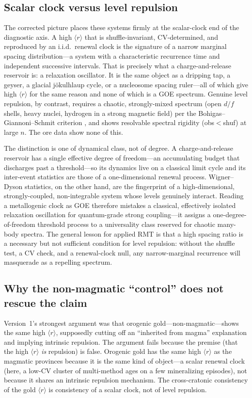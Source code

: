 \documentclass[12pt,a4paper]{article}
\newcommand{\rbar}{\langle r\rangle}
\begin{document}
\subsection{Scalar clock versus level repulsion}
The corrected picture places these systems firmly at the scalar-clock end of the
diagnostic axis. A high $\rbar$ that is shuffle-invariant, CV-determined, and
reproduced by an i.i.d.\ renewal clock is the signature of a narrow marginal
spacing distribution---a system with a characteristic recurrence time and
independent successive intervals. That is precisely what a charge-and-release
reservoir is: a relaxation oscillator. It is the same object as a dripping tap,
a geyser, a glacial j\"okulhlaup cycle, or a nucleosome spacing ruler---all of
which give high $\rbar$ for the same reason and none of which is a GOE spectrum.
Genuine level repulsion, by contrast, requires a chaotic, strongly-mixed spectrum
(open $d/f$ shells, heavy nuclei, hydrogen in a strong magnetic field) per the
Bohigas--Giannoni--Schmit criterion \citep{bgs1984}, and shows resolvable spectral
rigidity (obs$<$shuf) at large $n$. The ore data show none of this.

The distinction is one of dynamical class, not of degree. A charge-and-release
reservoir has a single effective degree of freedom---an accumulating budget that
discharges past a threshold---so its dynamics live on a classical limit cycle and
its inter-event statistics are those of a one-dimensional renewal process.
Wigner--Dyson statistics, on the other hand, are the fingerprint of a
high-dimensional, strongly-coupled, non-integrable system whose levels genuinely
interact. Reading a metallogenic clock as GOE therefore mistakes a classical,
effectively isolated relaxation oscillation for quantum-grade strong coupling---it
assigns a one-degree-of-freedom threshold process to a universality class reserved
for chaotic many-body spectra. The general lesson for applied RMT is that a high
spacing ratio is a necessary but not sufficient condition for level repulsion:
without the shuffle test, a CV check, and a renewal-clock null, any narrow-marginal
recurrence will masquerade as a repelling spectrum.

\subsection{Why the non-magmatic ``control'' does not rescue the claim}
Version~1's strongest argument was that orogenic gold---non-magmatic---shows the
same high $\rbar$, supposedly cutting off an ``inherited from magma'' explanation
and implying intrinsic repulsion. The argument fails because the premise (that the
high $\rbar$ \emph{is} repulsion) is false. Orogenic gold has the same high
$\rbar$ as the magmatic provinces because it is the same kind of object---a scalar
renewal clock (here, a low-CV cluster of multi-method ages on a few mineralizing
episodes), not because it shares an intrinsic repulsion mechanism. The
cross-cratonic consistency of the gold $\rbar$ is consistency of a scalar clock,
not of level repulsion.
\end{document}
